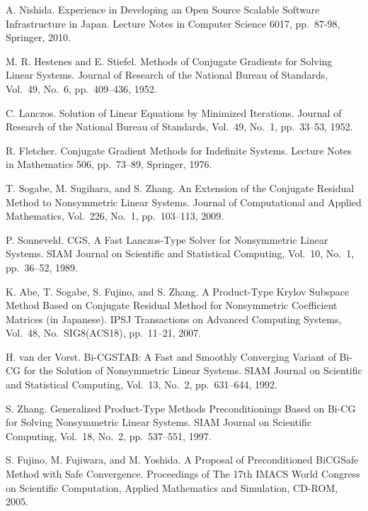 \documentclass[a4paper]{article}
\begin{document}
\newpage
{}
\begin{thebibliography}{10}
A. Nishida.
\newblock Experience in Developing an Open Source Scalable Software
	Infrastructure in Japan.
\newblock Lecture Notes in Computer Science 6017, pp.\ 87-98, Springer, 2010.

M. R. Hestenes and E. Stiefel.
\newblock Methods of Conjugate Gradients for Solving Linear Systems.
\newblock Journal of Research of the National Bureau of Standards, Vol.~49, No.~6, pp.\ 409--436, 1952.

C. Lanczos.
\newblock Solution of Linear Equations by Minimized Iterations.
\newblock Journal of Research of the National Bureau of Standards, Vol.~49, No.~1, pp.\ 33--53, 1952.

R. Fletcher.
\newblock Conjugate Gradient Methods for Indefinite Systems.
\newblock Lecture Notes in Mathematics 506, pp.\ 73--89, Springer, 1976.

T. Sogabe, M. Sugihara, and S. Zhang.
\newblock An Extension of the Conjugate Residual Method to Nonsymmetric Linear Systems.
\newblock Journal of Computational and Applied Mathematics, Vol.~226,
	No.~1, pp.\ 103--113, 2009.

P. Sonneveld.
\newblock CGS, A Fast Lanczos-Type Solver for Nonsymmetric Linear Systems.
\newblock SIAM Journal on Scientific and Statistical Computing, Vol.~10, No.~1, pp.\ 36--52, 1989.

K. Abe, T. Sogabe, S. Fujino, and S. Zhang.
\newblock A Product-Type Krylov Subspace Method Based on Conjugate Residual Method for Nonsymmetric Coefficient Matrices (in Japanese).
\newblock IPSJ Transactions on Advanced Computing Systems,  Vol.~48, No.~SIG8(ACS18), pp.\ 11--21, 2007.

H. van der Vorst.
\newblock Bi-CGSTAB: A Fast and Smoothly Converging Variant of Bi-CG for
	the Solution of Nonsymmetric Linear Systems.
\newblock SIAM Journal on Scientific and Statistical Computing, Vol.~13, No.~2, pp.\ 631--644, 1992.

S. Zhang.
\newblock Generalized Product-Type Methods Preconditionings Based on
	Bi-CG for Solving Nonsymmetric Linear Systems.
\newblock SIAM Journal on Scientific Computing, Vol.~18, No.~2, pp.\ 537--551, 1997. 

S. Fujino, M. Fujiwara, and M. Yoshida.
\newblock A Proposal of Preconditioned BiCGSafe Method with Safe Convergence.
\newblock Proceedings of The 17th IMACS World Congress on Scientific
	Computation, Applied Mathematics and Simulation, CD-ROM, 2005.


\end{thebibliography}
\end{document}
